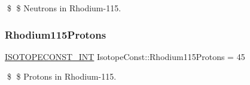 \$ \$ Neutrons in Rhodium-\/115. \mbox{\label{group___isotope_const-_rhodium-_rh115_gaa4e1706ec8ca7fb2a1a4c312ca56130f}} 
\subsubsection{\texorpdfstring{Rhodium115\+Protons}{Rhodium115Protons}}
{\footnotesize\ttfamily \mbox{\hyperlink{group___isotope_const-_macros_ga5f18360b3e99483a35c32d789e62621c}{I\+S\+O\+T\+O\+P\+E\+C\+O\+N\+S\+T\+\_\+\+I\+NT}} Isotope\+Const\+::\+Rhodium115\+Protons = 45}

\$ \$ Protons in Rhodium-\/115. 